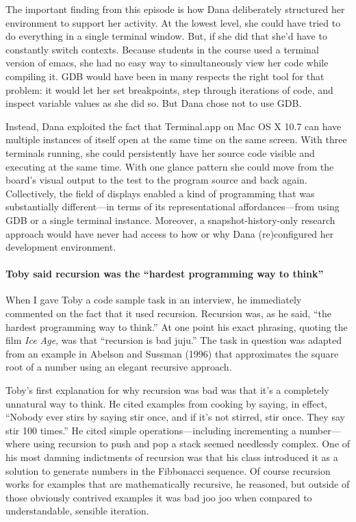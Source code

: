 The important finding from this episode is how Dana deliberately
structured her environment to support her activity. At the lowest level,
she could have tried to do everything in a single terminal window. But,
if she did that she'd have to constantly switch contexts. Because
students in the course used a terminal version of emacs, she had no easy
way to simultaneously view her code while compiling it. GDB would have
been in many respects the right tool for that problem: it would let her
set breakpoints, step through iterations of code, and inspect variable
values as she did so. But Dana chose not to use GDB.

Instead, Dana exploited the fact that Terminal.app on Mac OS X 10.7 can
have multiple instances of itself open at the same time on the same
screen. With three terminals running, she could persistently have her
source code visible and executing at the same time. With one glance
pattern she could move from the board's visual output to the test to the
program source and back again. Collectively, the field of displays
enabled a kind of programming that was substantially different---in
terms of its representational affordances---from using GDB or a single
terminal instance. Moreover, a snapshot-history-only research approach
would have never had access to how or why Dana (re)configured her
development environment.

\paragraph{Toby said recursion was the ``hardest programming way to
think''}\label{toby-said-recursion-was-the-hardest-programming-way-to-think}

When I gave Toby a code sample task in an interview, he immediately
commented on the fact that it used recursion. Recursion was, as he said,
``the hardest programming way to think.'' At one point his exact
phrasing, quoting the film \emph{Ice Age}, was that ``recursion is bad
juju.'' The task in question was adapted from an example in Abelson and
Sussman (1996) that approximates the square root of a number using an
elegant recursive approach.

Toby's first explanation for why recursion was bad was that it's a
completely unnatural way to think. He cited examples from cooking by
saying, in effect, ``Nobody ever stirs by saying stir once, and if it's
not stirred, stir once. They say stir 100 times.'' He cited simple
operations---including incrementing a number---where using recursion to
push and pop a stack seemed needlessly complex. One of his most damning
indictments of recursion was that his class introduced it as a solution
to generate numbers in the Fibbonacci sequence. Of course recursion
works for examples that are mathematically recursive, he reasoned, but
outside of those obviously contrived examples it was bad joo joo when
compared to understandable, sensible iteration.

